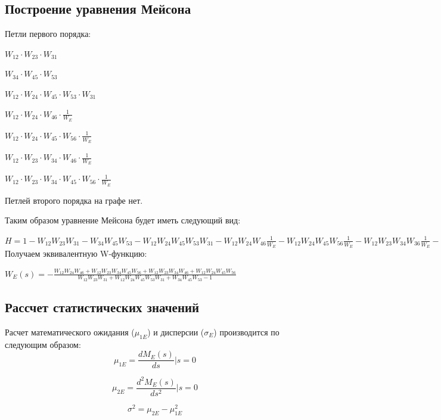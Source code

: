 \documentclass[14pt,a4paper,report]{report}
\begin{document}
\subsection{Построение уравнения Мейсона}

Петли первого порядка:

$W_{12}\cdot W_{23}\cdot W_{31}$

$W_{34}\cdot W_{45}\cdot W_{53}$

$W_{12}\cdot W_{24}\cdot W_{45}\cdot W_{53}\cdot W_{31}$

$W_{12}\cdot W_{24}\cdot W_{46}\cdot \frac{1}{W_E}$

$W_{12}\cdot W_{24}\cdot W_{45}\cdot W_{56}\cdot \frac{1}{W_E}$

$W_{12}\cdot W_{23}\cdot W_{34}\cdot W_{46}\cdot \frac{1}{W_E}$

$W_{12}\cdot W_{23}\cdot W_{34}\cdot W_{45}\cdot W_{56}\cdot \frac{1}{W_E}$

Петлей второго порядка на графе нет.

Таким образом уравнение Мейсона будет иметь следующий вид:

$H=1 - W_{12}W_{23}W_{31} 
- W_{34}W_{45}W_{53} 
- W_{12}W_{24}W_{45}W_{53}W_{31} 
- W_{12}W_{24}W_{46}\frac{1}{W_E} 
- W_{12}W_{24}W_{45}W_{56}\frac{1}{W_E} 
- W_{12}W_{23}W_{34}W_{36}\frac{1}{W_E} 
- W_{12}W_{23}W_{34}W_{45}W_{56}\frac{1}{W_E}$\\

Получаем эквивалентную W-функцию:

$W_E(s)=- \frac{W_{12}W_{24}W_{46} 
+ W_{12}W_{23}W_{34}W_{45}W_{56}
+ W_{12}W_{23}W_{34}W_{46}
+ W_{12}W_{24}W_{45}W_{56}}
{W_{12}W_{23}W_{31} +W_{12}W_{24}W_{45}W_{53}W_{31}+W_{34}W_{45}W_{53} -1}$\\

\subsection{Рассчет статистических значений}

Расчет математического ожидания ($\mu_{1E}$) и дисперсии ($\sigma_E$) производится по следующим образом:
$$\mu_{1E}=\frac{d M_E(s)}{ds}|s=0$$

$$\mu_{2E}=\frac{d^2 M_E(s)}{ds^2}|s=0$$

$$\sigma^2=\mu_{2E}-\mu_{1E}^2$$
\end{document}
